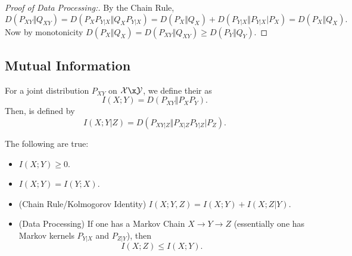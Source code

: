 \begin{proof}
	[Proof of Data Processing:]
	By the Chain Rule, \[
		D(P_{XY} \Vert Q_{XY}) = D(P_XP_{Y|X} \Vert Q_XP_{Y|X}) = D(P_X\Vert Q_X) + D(P_{Y|X}\Vert P_{Y|X} |P_X) = D(P_X\Vert Q_X).
	\]
	Now by monotonicity $D(P_X\Vert Q_X) = D(P_{XY} \Vert Q_{XY}) \geq D(P_Y\Vert Q_Y)$.
\end{proof}

\subsection{Mutual Information}

\begin{defn}
	For a joint distribution $P_{XY}$ on $\mathcal X \x \mathcal Y$, we define their  as \[
		I(X;Y) = D(P_{XY} \Vert P_XP_Y).
	\]
	Then,  is defined by \[
		I(X;Y|Z) = D(P_{XY|Z} \Vert P_{X|Z} P_{Y|Z} |P_Z).
	\]
\end{defn}

\begin{fact}
	The following are true:
	\begin{itemize}
		\item $I(X;Y) \geq 0$.
		\item $I(X;Y) = I(Y;X)$.
		\item (Chain Rule/Kolmogorov Identity) $I(X;Y,Z) = I(X;Y) + I(X;Z|Y)$.
		\item (Data Processing) If one has a Markov Chain $X\to Y \to Z$ (essentially one has Markov kernels $P_{Y|X}$ and $P_{Z|Y}$), then \[
				I(X;Z) \leq I(X;Y).
			\]
	\end{itemize}
\end{fact}
